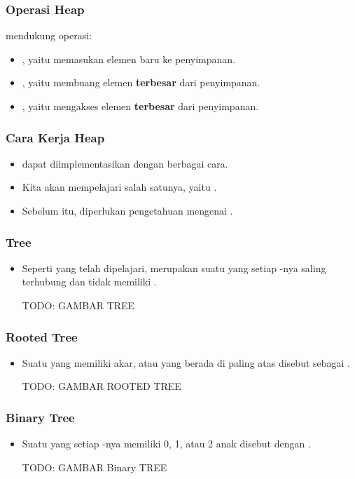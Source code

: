 \begin{frame}
\frametitle{Operasi Heap}
\pHeap mendukung operasi:
\begin{itemize}
  \item {}, yaitu memasukan elemen baru ke penyimpanan.
  \item {}, yaitu membuang elemen \textbf{terbesar} dari penyimpanan.
  \item {}, yaitu mengakses elemen \textbf{terbesar} dari penyimpanan. 
\end{itemize}
\end{frame}

\begin{frame}
\frametitle{Cara Kerja Heap}
\begin{itemize}
  \item \pHeap dapat diimplementasikan dengan berbagai cara.
  \item Kita akan mempelajari salah satunya, yaitu \pBinaryHeap.
  \item Sebelum itu, diperlukan pengetahuan mengenai .
\end{itemize}
\end{frame}

\begin{frame}
\frametitle{Tree}
\begin{itemize}
  \item Seperti yang telah dipelajari, \ftree merupakan suatu \fgraph yang setiap \fnode-nya saling terhubung dan tidak memiliki .
  
  TODO: GAMBAR TREE
\end{itemize}
\end{frame}

\begin{frame}
\frametitle{Rooted Tree}
\begin{itemize}
  \item Suatu \ftree yang memiliki akar, atau \fnode yang berada di paling atas disebut sebagai .
  
  TODO: GAMBAR ROOTED TREE
\end{itemize}
\end{frame}

\begin{frame}
\frametitle{Binary Tree}
\begin{itemize}
  \item Suatu  yang setiap \fnode-nya memiliki 0, 1, atau 2 anak disebut dengan .
  
  TODO: GAMBAR Binary TREE
\end{itemize}
\end{frame}

